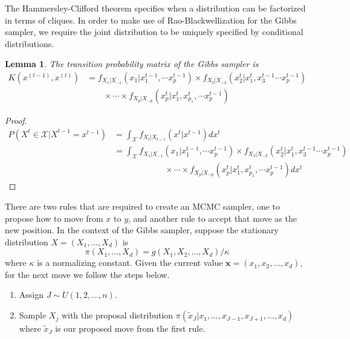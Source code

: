 \documentclass{article}%
\newtheorem{lemma}[theorem]{Lemma}
\theoremstyle{definition}
\begin{document}
\noindent The Hammersley-Clifford theorem specifies when a distribution can be factorized in terms of cliques. In order to make use of Rao-Blackwellization for the Gibbs sampler, we require the joint distribution to be uniquely specified by conditional distributions. 
\begin{lemma}
The transition probability matrix of the Gibbs sampler is 
\begin{align}
\nonumber    K(x^{(t-1)},x^{(t)}) &= f_{X_1|X_{-1}}(x_1 | x_1^{t-1}, \cdots x_{p}^{t-1}) \times f_{X_2 | X_{-2}}(x_2^t | x_1^{t}, x_3^{t-1} \cdots x_{p}^{t-1}) \\
    &\qquad \times \cdots \times f_{X_p | X_{-p} }(x_p^t | x_1^{t}, x_{p_1}^{t}, \cdots x_{p}^{t-1})
\end{align}
\end{lemma}
\begin{proof}
\begin{align}
P(X^t \in \mathcal{X} | X^{t-1} = x^{t-1}) &= \int_\mathcal{X} f_{X_t | X_{t-1}}(x^t | x^{t-1})dx^t \\
\nonumber &= \int_\mathcal{X} f_{X_1|X_{-1}}(x_1 | x_1^{t-1}, \cdots x_{p}^{t-1}) \times f_{X_2 | X_{-2}}(x_2^t | x_1^{t}, x_3^{t-1} \cdots x_{p}^{t-1}) \\
    &\qquad \qquad \qquad \times \cdots \times f_{X_p | X_{-p} }(x_p^t | x_1^{t}, x_{p_1}^{t}, \cdots x_{p}^{t-1}) dx^t
\end{align}
\end{proof}
There are two rules that are required to create an MCMC sampler, one to propose how to move from $x$ to $y$, and another rule to accept that move as the new position. In the context of the Gibbs sampler, suppose the stationary distribution \textbf{$X$}$=(X_1,\ldots,X_d)$ is 
\begin{equation}
    \pi(X_1,\ldots,X_d) = g(X_1,X_2,\ldots,X_d)/ \kappa
\end{equation}
\noindent where $\kappa$ is a normalizing constant. Given the current value $\mathbf{x}=(x_1,x_2,\ldots,x_d)$, for the next move we follow the steps below.
\begin{enumerate}
    \item Assign $J\sim U(1,2,\ldots,n)$.
    \item Sample $X_j$ with the proposal distribution $\pi(\tilde{x}_J|x_1,\ldots,x_{J-1},x_{J+1},\ldots,x_d)$ where $\tilde{x}_J$ is our proposed move from the first rule. 
\end{enumerate}
\end{document}
